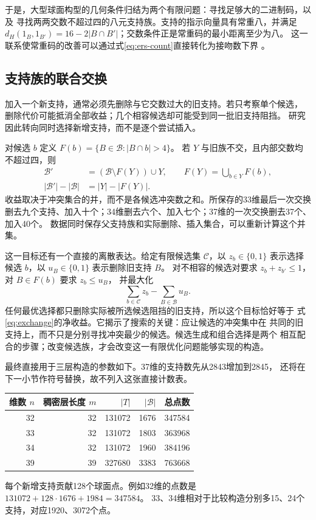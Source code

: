 于是，大型球面构型的几何条件归结为两个有限问题：寻找足够大的二进制码，以及
寻找两两交数不超过四的八元支持族。支持的指示向量具有常重八，并满足
$d_H(1_B,1_{B'})=16-2|B\cap B'|$；交数条件正是常重码的最小距离至少为八。
这一联系使常重码的改善可以通过式\eqref{eq:ers-count}直接转化为接吻数下界
\cite{bsss,brouwer,echols}。

\subsection{支持族的联合交换}

加入一个新支持，通常必须先删除与它交数过大的旧支持。若只考察单个候选，
删除代价可能抵消全部收益；几个相容候选却可能受到同一批旧支持阻挡。
研究因此转向同时选择新增支持，而不是逐个尝试插入。

对候选 $b$ 定义 $F(b)=\{B\in\mathcal B:|B\cap b|>4\}$。
若 $Y$ 与旧族不交，且内部交数均不超过四，则
\begin{equation}
\begin{split}
\mathcal B'&=(\mathcal B\setminus F(Y))\cup Y,\qquad
 F(Y)=\bigcup_{b\in Y}F(b),\\
|\mathcal B'|-|\mathcal B|&=|Y|-|F(Y)|.
\end{split}
\label{eq:exchange}
\end{equation}
收益取决于冲突集合的并，而不是各候选冲突数之和。所保存的33维最后一次交换
删去九个支持、加入十个；34维删去六个、加入七个；37维的一次交换删去37个、加入40个。
数据同时保存父支持族和实际删除、插入集合，可以重新计算这个并集。

这一目标还有一个直接的离散表达。给定有限候选集 $\mathcal C$，以
$z_b\in\{0,1\}$ 表示选择候选 $b$，以 $u_B\in\{0,1\}$ 表示删除旧支持 $B$。
对不相容的候选对要求 $z_b+z_{b'}\le1$，对 $B\in F(b)$ 要求 $z_b\le u_B$，
并最大化
\[
\sum_{b\in\mathcal C}z_b-\sum_{B\in\mathcal B}u_B.
\]
任何最优选择都只删除实际被所选候选阻挡的旧支持，所以这个目标恰好等于
式\eqref{eq:exchange}的净收益。它揭示了搜索的关键：应让候选的冲突集中在
共同的旧支持上，而不只是分别寻找冲突最少的候选。候选生成和组合选择是两个
相互配合的步骤；改变候选族，才会改变这一有限优化问题能够实现的构造。

最终直接用于三层构造的参数如下。37维的支持数先从2843增加到2845，
还将在下一小节作符号替换，故不列入这张直接计数表。
\begin{center}
\begin{minipage}{\linewidth}\centering
{}
\label{tab:code-parameters}
\begin{tabular}{rrrrr}
\toprule
维数 $n$ & 稠密层长度 $m$ & $|T|$ & $|\mathcal B|$ & 总点数\\
\midrule
32&32&131072&1676&347584\\
33&32&131072&1803&363968\\
34&32&131072&1960&384196\\
39&39&327680&3383&763668\\
\bottomrule
\end{tabular}
\end{minipage}
\end{center}
每个新增支持贡献128个球面点。例如32维的点数是
$131072+128\cdot1676+1984=347584$。
33、34维相对于比较构造分别多15、24个支持，对应1920、3072个点。

